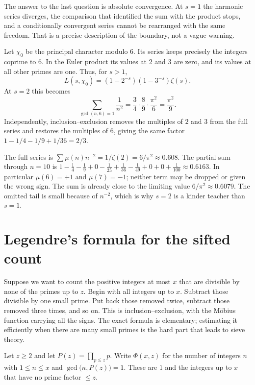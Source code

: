 The answer to the last question is absolute convergence. At $s=1$ the harmonic series diverges, the comparison that identified the sum with the product stops, and a conditionally convergent series cannot be rearranged with the same freedom. That is a precise description of the boundary, not a vague warning.

\begin{examplex}
Let $\chi_0$ be the principal character modulo $6$. Its series keeps precisely the integers coprime to $6$. In the Euler product its values at $2$ and $3$ are zero, and its values at all other primes are one. Thus, for $s>1$,
\[
L(s,\chi_0)=(1-2^{-s})(1-3^{-s})\zeta(s).
\]
At $s=2$ this becomes
\[
\sum_{\gcd(n,6)=1}\frac1{n^2}
=\frac34\cdot\frac89\cdot\frac{\pi^2}6
=\frac{\pi^2}9.
\]
Independently, inclusion--exclusion removes the multiples of $2$ and $3$ from the full series and restores the multiples of $6$, giving the same factor $1-1/4-1/9+1/36=2/3$.
\end{examplex}

\begin{examplex}[the series for $\mu$ at $s=2$]
The full series is $\sum\mu(n)n^{-2}=1/\zeta(2)=6/\pi^2\approx 0.608$. The partial sum through $n=10$ is
$1-\frac14-\frac19+0-\frac1{25}+\frac1{36}-\frac1{49}+0+0+\frac1{100}\approx0.6163$.
In particular $\mu(6)=+1$ and $\mu(7)=-1$; neither term may be dropped or given the wrong sign. The sum is already close to the limiting value $6/\pi^2\approx0.6079$. The omitted tail is small because of $n^{-2}$, which is why $s=2$ is a kinder teacher than $s=1$.
\end{examplex}

\section{Legendre's formula for the sifted count}

Suppose we want to count the positive integers at most $x$ that are divisible by none of the primes up to $z$. Begin with all integers up to $x$. Subtract those divisible by one small prime. Put back those removed twice, subtract those removed three times, and so on. This is inclusion--exclusion, with the Möbius function carrying all the signs. The exact formula is elementary; estimating it efficiently when there are many small primes is the hard part that leads to sieve theory.

Let $z\ge2$ and let $P(z)=\prod_{p\le z}p$. Write $\Phi(x,z)$ for the number of integers $n$ with $1\le n\le x$ and $\gcd\bigl(n,P(z)\bigr)=1$. These are $1$ and the integers up to $x$ that have no prime factor $\le z$.

